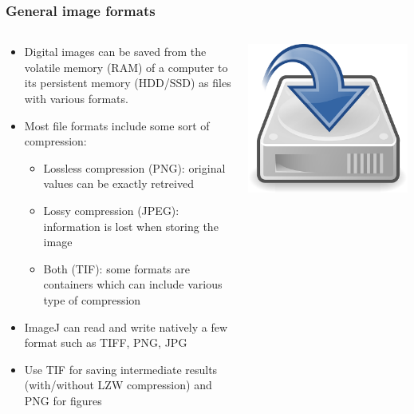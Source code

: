 \documentclass[ignorenonframetext,aspectratio=169,10pt,xcolor=table]{beamer}
\begin{document}
\begin{frame} \frametitle{General image formats}

  \begin{columns}

    \begin{column}{0.75\textwidth}
      \begin{itemize} \setlength\itemsep{1em}
      \item Digital images can be saved from the volatile memory (RAM)
        of a computer to its persistent memory (HDD/SSD) as files with various
        formats.
      \item Most file formats include some sort of compression:
        \begin{itemize}
        \item Lossless compression (PNG): original values can be
          exactly retreived
        \item Lossy compression (JPEG): information is lost when
          storing the image
        \item Both (TIF): some formats are containers which can
          include various type of compression
        \end{itemize}
      \item ImageJ can read and write natively a few format such as
        TIFF, PNG, JPG
      \item Use TIF for saving intermediate results (with/without LZW
        compression) and PNG for figures
      \end{itemize}
    \end{column}

    \begin{column}{0.25\textwidth}
      \includegraphics[width=\textwidth]{drive}
    \end{column}

  \end{columns}

\end{frame}
\end{document}
